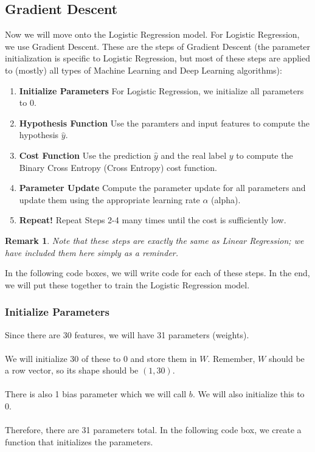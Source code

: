\documentclass{article}
\newtheorem*{remark}{Remark}
\begin{document}
\subsection{Gradient Descent}
Now we will move onto the Logistic Regression model. For Logistic Regression, we use Gradient Descent. These are the steps of Gradient Descent (the parameter initialization is specific to Logistic Regression, but most of these steps are applied to (mostly) all types of Machine Learning and Deep Learning algorithms): 
\begin{enumerate}
    \item \textbf{Initialize Parameters}
    For Logistic Regression, we initialize all parameters to 0.
    \item \textbf{Hypothesis Function}
    Use the paramters and input features to compute the hypothesis $\hat{y}$. 
    \item \textbf{Cost Function}
    Use the prediction $\hat{y}$ and the real label $y$ to compute the Binary Cross Entropy (Cross Entropy) cost function.
    \item \textbf{Parameter Update}
    Compute the parameter update for all parameters and update them using the appropriate learning rate $\alpha$ (alpha).
    \item \textbf{Repeat!}
    Repeat Steps 2-4 many times until the cost is sufficiently low.
\end{enumerate}

\begin{remark}
Note that these steps are exactly the same as Linear Regression; we have included them here simply as a reminder.
\end{remark}

In the following code boxes, we will write code for each of these steps. In the end, we will put these together to train the Logistic Regression model.

\subsubsection{Initialize Parameters}
Since there are 30 features, we will have 31 parameters (weights). 
\\
\\
We will initialize 30 of these to 0 and store them in $W$. Remember, $W$ should be a row vector, so its shape should be $(1,30)$.
\\
\\
There is also 1 bias parameter which we will call $b$. We will also initialize this to 0.
\\
\\
Therefore, there are 31 parameters total. In the following code box, we create a function that initializes the parameters.
\end{document}
